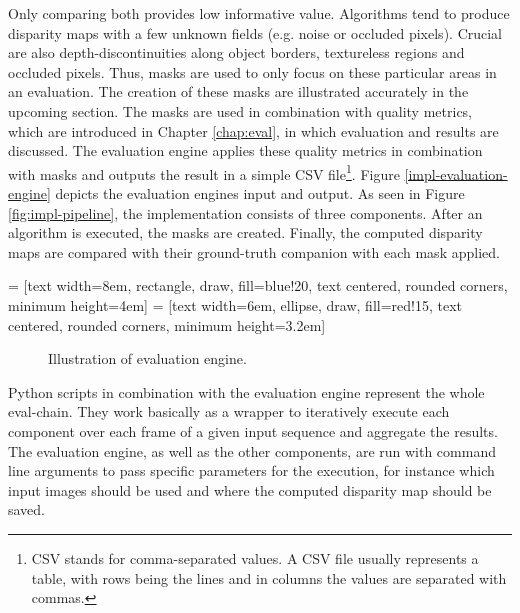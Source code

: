 Only comparing both provides low informative value.
Algorithms tend to produce disparity maps with a few unknown fields (e.g. noise or occluded pixels).
Crucial are also depth-discontinuities along object borders, textureless regions and occluded pixels.
Thus, masks are used to only focus on these particular areas in an evaluation.
The creation of these masks are illustrated accurately in the upcoming section.
The masks are used in combination with quality metrics, which are introduced in Chapter \ref{chap:eval}, in which evaluation and results are discussed.
The evaluation engine applies these quality metrics in combination with masks and outputs the result in a simple CSV file\footnote{CSV stands for comma-separated values. A CSV file usually represents a table, with rows being the lines and in columns the values are separated with commas.}.
Figure \ref{impl-evaluation-engine} depicts the evaluation engines input and output.
As seen in Figure \ref{fig:impl-pipeline}, the implementation consists of three components.
After an algorithm is executed, the masks are created.
Finally, the computed disparity maps are compared with their ground-truth companion with each mask applied.

 = [text width=8em, rectangle, draw, fill=blue!20, text centered, rounded corners, minimum height=4em]
 = [text width=6em, ellipse, draw, fill=red!15, text centered, rounded corners, minimum height=3.2em]
\begin{figure}[h!]
  \centering
  \caption{Illustration of evaluation engine.}
  \label{fig:impl-evaluation-engine}
\end{figure}

\noindent Python scripts in combination with the evaluation engine represent the whole eval-chain.
They work basically as a wrapper to iteratively execute each component over each frame of a given input sequence and aggregate the results.
The evaluation engine, as well as the other components, are run with command line arguments to pass specific parameters for the execution, for instance which input images should be used and where the computed disparity map should be saved.


